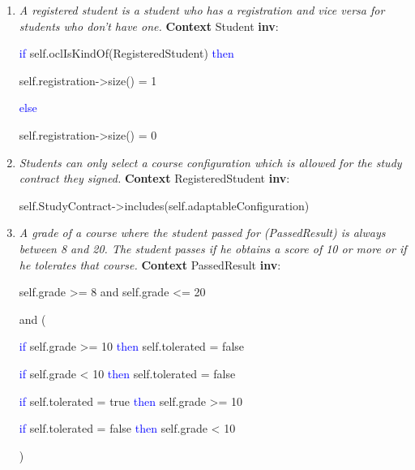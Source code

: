 \begin{enumerate}
	\item  \emph{A registered student is a student who has a registration and vice
	versa for students who don't have one.}
	\npar \textbf{Context} Student \textbf{inv}:
	\par \hspace*{5 mm} \textcolor{Blue}{if}
	self.oclIsKindOf(RegisteredStudent) \textcolor{Blue}{then}
	\par \hspace*{10 mm} self.registration->size() = 1
	\par \hspace*{5 mm} \textcolor{Blue}{else}
	\par \hspace*{10 mm} self.registration->size() = 0
	
	\item \emph{Students can only select a course configuration which is allowed
	for the study contract they signed.}
	\npar \textbf{Context} RegisteredStudent \textbf{inv}:
	\par \hspace*{5 mm} self.StudyContract->includes(self.adaptableConfiguration)
	
	\item \emph{A grade of a course where the student passed for (PassedResult) is
	always between 8 and 20. The student passes if he obtains a score of 10 or
	more or if he tolerates that course.}
	\npar \textbf{Context} PassedResult \textbf{inv}:
	\par \hspace*{5 mm} self.grade >= 8 and self.grade <= 20
	\par \hspace*{5 mm} and (
	\par \hspace*{10 mm} \textcolor{Blue}{if} self.grade >= 10
	\textcolor{Blue}{then} self.tolerated = false 
	\par \hspace*{10 mm} \textcolor{Blue}{if} self.grade < 10 \textcolor{Blue}{then}
	self.tolerated = false 
	\par \hspace*{10 mm} \textcolor{Blue}{if} self.tolerated = true \textcolor{Blue}{then} self.grade >= 10
	\par \hspace*{10 mm} \textcolor{Blue}{if} self.tolerated = false \textcolor{Blue}{then} self.grade < 10
	\par \hspace*{5 mm} )
	

\end{enumerate}
